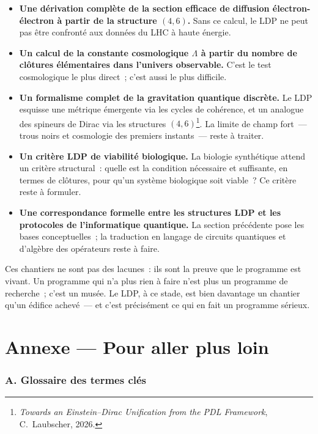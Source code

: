 \documentclass[12pt, a4paper, openright]{book}
\begin{document}
\begin{itemize}
\item \textbf{Une dérivation complète de la section efficace de diffusion électron-électron à partir de la structure $(4,6)$.} Sans ce calcul, le LDP ne peut pas être confronté aux données du LHC à haute énergie.
\item \textbf{Un calcul de la constante cosmologique $\Lambda$ à partir du nombre de clôtures élémentaires dans l'univers observable.} C'est le test cosmologique le plus direct~; c'est aussi le plus difficile.
\item \textbf{Un formalisme complet de la gravitation quantique discrète.} Le LDP esquisse une métrique émergente via les cycles de cohérence, et un analogue des spineurs de Dirac via les structures $(4,6)$\footnote{\textit{Towards an Einstein--Dirac Unification from the PDL Framework}, C.~Laubscher, 2026.}. La limite de champ fort~--- trous noirs et cosmologie des premiers instants~--- reste à traiter.
\item \textbf{Un critère LDP de viabilité biologique.} La biologie synthétique attend un critère structural~: quelle est la condition nécessaire et suffisante, en termes de clôtures, pour qu'un système biologique soit viable~? Ce critère reste à formuler.
\item \textbf{Une correspondance formelle entre les structures LDP et les protocoles de l'informatique quantique.} La section précédente pose les bases conceptuelles~; la traduction en langage de circuits quantiques et d'algèbre des opérateurs reste à faire.
\end{itemize}

Ces chantiers ne sont pas des lacunes~: ils sont la preuve que le programme est vivant. Un programme qui n'a plus rien à faire n'est plus un programme de recherche~; c'est un musée. Le LDP, à ce stade, est bien davantage un chantier qu'un édifice achevé~--- et c'est précisément ce qui en fait un programme sérieux.

\backmatter
\appendix

\chapter*{Annexe — Pour aller plus loin}

\subsection*{A. Glossaire des termes clés}
\end{document}
